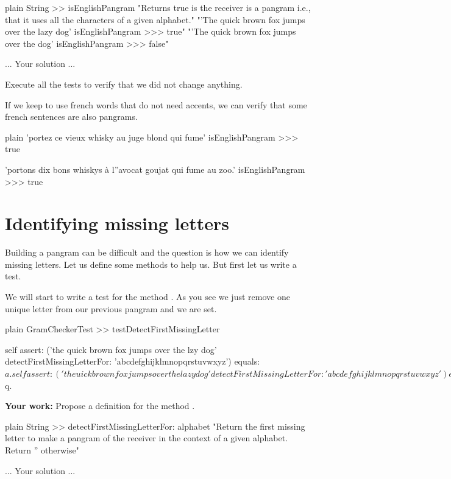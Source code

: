 \documentclass[10pt,twoside,english]{_support/latex/sbabook/sbabook}
\begin{document}
\begin{displaycode}{plain}
String >> isEnglishPangram
	"Returns true is the receiver is a pangram i.e., that it uses all the characters of a given alphabet."
	"'The quick brown fox jumps over the lazy dog' isEnglishPangram
	>>> true"
	"'The quick brown fox jumps over the dog' isEnglishPangram
	>>> false"

	... Your solution ...
\end{displaycode}

Execute all the tests to verify that we did not change anything.

If we keep to use french words that do not need accents, we can verify that some french sentences are also pangrams. 

\begin{displaycode}{plain}
'portez ce vieux whisky au juge blond qui fume' isEnglishPangram
>>> true

'portons dix bons whiskys à l''avocat goujat qui fume au zoo.' isEnglishPangram
>>> true
\end{displaycode}
\section{Identifying missing letters}
Building a pangram can be difficult and the question is how we can identify missing letters. Let us define some methods to help us. But first let us write a test. 

We will start to write a test for the method . As you see we just remove one unique letter from our previous pangram and we are set.

\begin{displaycode}{plain}
GramCheckerTest >> testDetectFirstMissingLetter

	self assert: ('the quick brown fox jumps over the lzy dog' 
		detectFirstMissingLetterFor: 'abcdefghijklmnopqrstuvwxyz') equals: $a.
	self assert: ('the uick brown fox jumps over the lazy dog' 
		detectFirstMissingLetterFor: 'abcdefghijklmnopqrstuvwxyz') equals: $q.
\end{displaycode}

\textbf{Your work:} Propose a definition for the method .

\begin{displaycode}{plain}
String >> detectFirstMissingLetterFor: alphabet
	"Return the first missing letter to make a pangram of the receiver in the context of a given alphabet. 
	Return '' otherwise"
	
	... Your solution ...
	
\end{displaycode}
\end{document}
